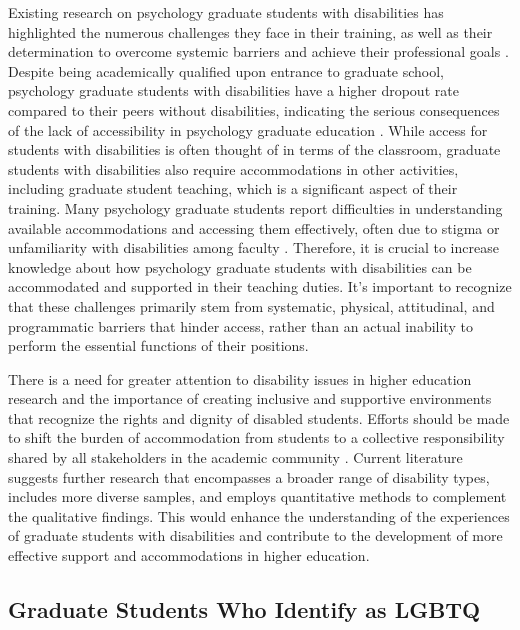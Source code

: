 \documentclass[
  11pt,
]{book}
\begin{document}
Existing research on psychology graduate students with disabilities has highlighted the numerous challenges they face in their training, as well as their determination to overcome systemic barriers and achieve their professional goals \citep{lund_investigating_2022}. Despite being academically qualified upon entrance to graduate school, psychology graduate students with disabilities have a higher dropout rate compared to their peers without disabilities, indicating the serious consequences of the lack of accessibility in psychology graduate education \citep{lund_investigating_2022}. While access for students with disabilities is often thought of in terms of the classroom, graduate students with disabilities also require accommodations in other activities, including graduate student teaching, which is a significant aspect of their training. Many psychology graduate students report difficulties in understanding available accommodations and accessing them effectively, often due to stigma or unfamiliarity with disabilities among faculty \citep{lund_investigating_2022}. Therefore, it is crucial to increase knowledge about how psychology graduate students with disabilities can be accommodated and supported in their teaching duties. It's important to recognize that these challenges primarily stem from systematic, physical, attitudinal, and programmatic barriers that hinder access, rather than an actual inability to perform the essential functions of their positions.

There is a need for greater attention to disability issues in higher education research and the importance of creating inclusive and supportive environments that recognize the rights and dignity of disabled students. Efforts should be made to shift the burden of accommodation from students to a collective responsibility shared by all stakeholders in the academic community \citep{koren_laissez-faire_2020}. Current literature suggests further research that encompasses a broader range of disability types, includes more diverse samples, and employs quantitative methods to complement the qualitative findings. This would enhance the understanding of the experiences of graduate students with disabilities and contribute to the development of more effective support and accommodations in higher education.

\subsection{Graduate Students Who Identify as LGBTQ}\label{graduate-students-who-identify-as-lgbtq}
\end{document}
